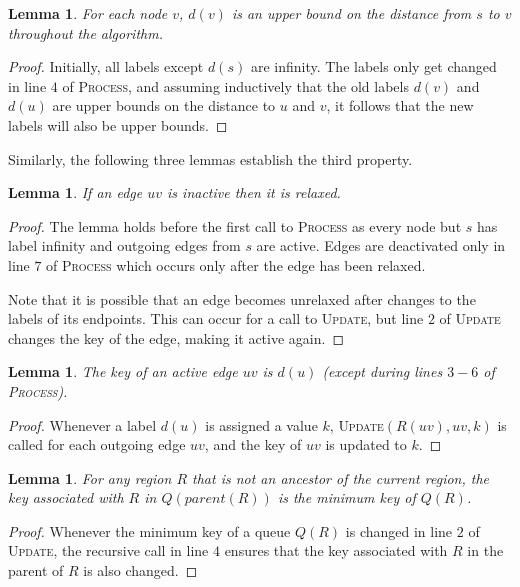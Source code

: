 \documentclass[12pt]{article}
\newtheorem{lemma}[theorem]{Lemma}
\begin{document}
\begin{lemma}
  For each node $v$, $d(v)$ is an upper bound on the distance from $s$ to $v$ throughout the algorithm.
\end{lemma}

\begin{proof}
  Initially, all labels except $d(s)$ are infinity. The labels only get changed in line $4$ of \textsc{Process}, and assuming inductively that the old labels $d(v)$ and $d(u)$ are upper bounds on the distance to $u$ and $v$, it follows that the new labels will also be upper bounds.
\end{proof}

Similarly, the following three lemmas establish the third property.\\

\begin{lemma}
  If an edge $uv$ is inactive then it is relaxed.
\end{lemma}

\begin{proof}
  The lemma holds before the first call to \textsc{Process} as every node but $s$ has label infinity and outgoing edges from $s$ are active. Edges are deactivated only in line $7$ of \textsc{Process} which occurs only after the edge has been relaxed.

  Note that it is possible that an edge becomes unrelaxed after changes to the labels of its endpoints. This can occur for a call to \textsc{Update}, but line $2$ of \textsc{Update} changes the key of the edge, making it active again.
\end{proof}

\begin{lemma}
  The key of an active edge $uv$ is $d(u)$ (except during lines $3-6$ of \textsc{Process}).
\end{lemma}

\begin{proof}
  Whenever a label $d(u)$ is assigned a value $k$, \textsc{Update}$(R(uv),uv,k)$ is called for each outgoing edge $uv$, and the key of $uv$ is updated to $k$.
\end{proof}

\begin{lemma}
  \label{lemma:invariant}
  For any region $R$ that is not an ancestor of the current region, the key associated with $R$ in $Q(parent(R))$ is the minimum key of $Q(R)$.
\end{lemma}

\begin{proof}
  Whenever the minimum key of a queue $Q(R)$ is changed in line $2$ of \textsc{Update}, the recursive call in line $4$ ensures that the key associated with $R$ in the parent of $R$ is also changed.
\end{proof}
\end{document}
